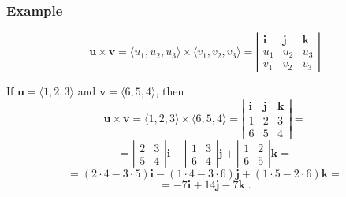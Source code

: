 \begin{frame}
 \frametitle{Example}

$$\textbf{u} \times \textbf{v} = \langle u_1, u_2, u_3 \rangle \times \langle v_1, v_2, v_3 \rangle =
\left|  \begin{array}{ccc}
      \textbf{i} & \textbf{j} & \textbf{k} \\
      u_1 & u_2 & u_3 \\
      v_1 & v_2 & v_3
        \end{array}
\right|$$

If $\textbf{u} = \langle 1,2,3\rangle$ and $\textbf{v} = \langle 6,5,4 \rangle$, then
%
$$\textbf{u} \times \textbf{v} = \langle 1, 2, 3 \rangle \times \langle 6, 5, 4 \rangle =
\left|  \begin{array}{ccc}
      \textbf{i} & \textbf{j} & \textbf{k} \\
      1 & 2 & 3 \\
      6 & 5 & 4
        \end{array}
\right| = $$
%
$$= \left| \begin{array}{cc}
           2 & 3\\
	   5 & 4
          \end{array}
\right| \textbf{i} - \left| \begin{array}{cc}
           1 & 3\\
	   6 & 4
          \end{array}
\right| \textbf{j} + \left| \begin{array}{cc}
           1 & 2\\
	   6 & 5
          \end{array}
\right| \textbf{k}  = $$
%
$$=(2\cdot 4 -3\cdot 5) \textbf{i} - (1\cdot 4 - 3\cdot 6) \textbf{j} + (1 \cdot 5 - 2\cdot 6) \textbf{k} =$$
%
$$= -7 \textbf{i} + 14 \textbf{j} -7 \textbf{k} \; .$$
%
\end{frame}

